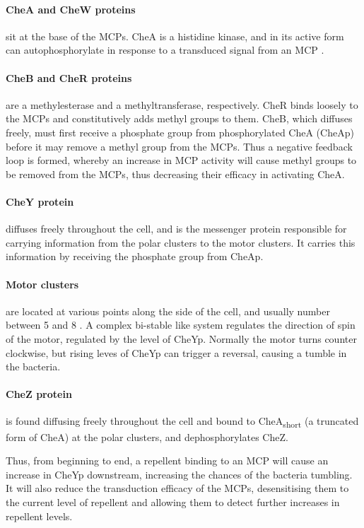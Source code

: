 \documentclass[../main.tex]{subfiles}
\begin{document}
\paragraph{CheA and CheW proteins} sit at the base of the MCPs. CheA is a histidine kinase, and in its active form can autophosphorylate in response to a transduced signal from an MCP \citep{sourjik10}.

\paragraph{CheB and CheR proteins} are a methylesterase and a methyltransferase, respectively. CheR binds loosely to the MCPs and constitutively adds methyl groups to them. CheB, which diffuses freely, must first receive a phosphate group from phosphorylated CheA (CheAp) before it may remove a methyl group from the MCPs. Thus a negative feedback loop is formed, whereby an increase in MCP activity will cause methyl groups to be removed from the MCPs, thus decreasing their efficacy in activating CheA.

\paragraph{CheY protein} diffuses freely throughout the cell, and is the messenger protein responsible for carrying information from the polar clusters to the motor clusters. It carries this information by receiving the phosphate group from CheAp.

\paragraph{Motor clusters} are located at various points along the side of the cell, and usually number between 5 and 8 \citep{wadhams04}. A complex bi-stable like system regulates the direction of spin of the motor, regulated by the level of CheYp. Normally the motor turns counter clockwise, but rising leves of CheYp can trigger a reversal, causing a tumble in the bacteria.

\paragraph{CheZ protein} is found diffusing freely throughout the cell and bound to CheA\textsubscript{short} (a truncated form of CheA) at the polar clusters, and dephosphorylates CheZ.

Thus, from beginning to end, a repellent binding to an MCP will cause an increase in CheYp downstream, increasing the chances of the bacteria tumbling. It will also reduce the transduction efficacy of the MCPs, desensitising them to the current level of repellent and allowing them to detect further increases in repellent levels.
\end{document}

